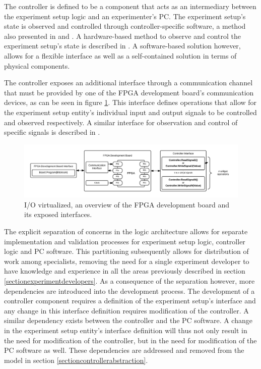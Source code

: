 \documentclass[main.tex]{subfiles}
\begin{document}

The controller is defined to be a component that acts as an intermediary between the experiment setup logic and an experimenter's PC. The experiment setup's state is observed and controlled through controller-specific software, a method also presented in \cite{holland2003harnessing} and \cite{bulic2013fpga}. A hardware-based method to observe and control the experiment setup's state is described in \cite{al2007teaching}. A software-based solution however, allows for a flexible interface as well as a self-contained solution in terms of physical components. 

The controller exposes an additional interface through a communication channel that must be provided by one of the FPGA development board's communication devices, as can be seen in figure \ref{fig:overview-inout}. This interface defines operations that allow for the experiment setup entity's individual input and output signals to be controlled and observed respectively. A similar interface for observation and control of specific signals is described in \cite{holland2003harnessing}. 

\begin{figure}[h]
\centering
\caption{I/O virtualized, an overview of the FPGA development board and its exposed interfaces.}
\label{fig:overview-inout}
\includegraphics[width=\textwidth]{img/overview-inout}
\end{figure}

The explicit separation of concerns in the logic architecture allows for separate implementation and validation processes for experiment setup logic, controller logic and PC software. This partitioning subsequently allows for distribution of work among specialists, removing the need for a single experiment developer to have knowledge and experience in all the areas previously described in section  \ref{sectionexperimentdevelopers}. As a consequence of the separation however, more dependencies are introduced into the development process. The development of a controller component requires a definition of the experiment setup's interface and any change in this interface definition requires modification of the controller. A similar dependency exists between the controller and the PC software. A change in the experiment setup entity's interface definition will thus not only result in the need for modification of the controller, but in the need for modification of the PC software as well. These dependencies are addressed and removed from the model in section \ref{sectioncontrollerabstraction}.
\end{document}
